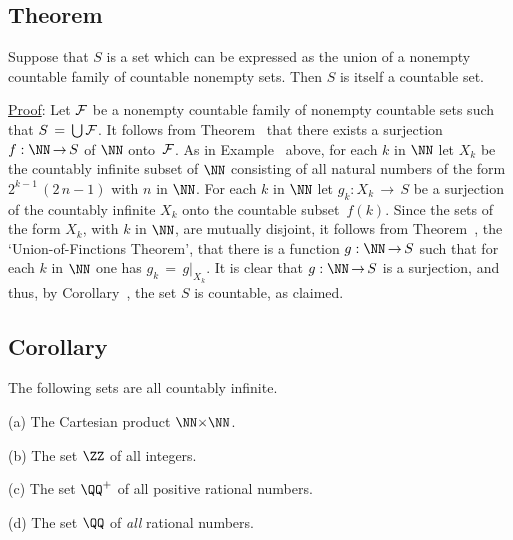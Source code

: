 \V
\V

            \subsection{\small{\bf Theorem}}
            \label{ThmA20.70}

        Suppose that $S$ is a set which can be expressed as the union of a nonempty countable family of countable nonempty sets.
    Then $S$ is itself a countable set.

\V

        \underline{Proof}: Let ${\cal F}$ be a nonempty countable family of nonempty countable sets such that $S \,=\, {\bigcup}\,{\cal F}$.
    It follows from Theorem~ that there exists a surjection $f:{\NN} \,{\rightarrow}\, S$ of ${\NN}$ onto~${\cal F}$.
    As in Example~ above, for each $k$ in ${\NN}$ let $X_{k}$ be the countably infinite subset of ${\NN}$
    consisting of all natural numbers of the form $2^{k-1}\,(2\,n-1)$ with $n$ in ${\NN}$.
    For each $k$ in ${\NN}$ let $g_{k}: X_{k} \,{\rightarrow}\, S$ be a surjection of the countably infinite $X_{k}$ onto the countable subset~$f(k)$.
    Since the sets of the form $X_{k}$, with $k$ in ${\NN}$, are mutually disjoint,
    it follows from Theorem~, the `Union-of-Finctions Theorem', that
    there is a function $g:{\NN} \,{\rightarrow}\, S$ such that for each $k$ in ${\NN}$ one has $g_{k} \,=\, g|_{X_{k}}$.
    It is clear that $g:{\NN} \,{\rightarrow}\, S$ is a surjection, and thus, by Corollary~, the set $S$ is countable, as claimed.
  
\V

            \subsection{\small{\bf Corollary}}
            \label{CorA20.80}

        The following sets are all countably infinite.

        (a) The Cartesian product ${\NN}{\times}{\NN}$.

\V

        (b) The set ${\ZZ}$ of all integers.

\V

        (c) The set ${\QQ}^{+}$ of all positive rational numbers.

\V

        (d) The set ${\QQ}$ of {\em all} rational numbers.

